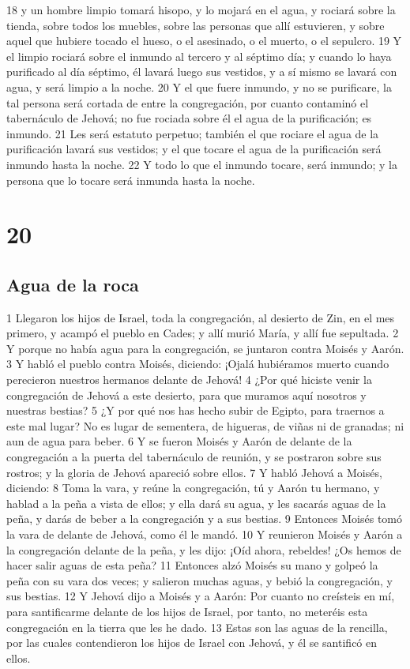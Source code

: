 18 y un hombre limpio tomará hisopo, y lo mojará en el agua, y rociará sobre la tienda, sobre todos los muebles, sobre las personas que allí estuvieren, y sobre aquel que hubiere tocado el hueso, o el asesinado, o el muerto, o el sepulcro.
19 Y el limpio rociará sobre el inmundo al tercero y al séptimo día; y cuando lo haya purificado al día séptimo, él lavará luego sus vestidos, y a sí mismo se lavará con agua, y será limpio a la noche.
20 Y el que fuere inmundo, y no se purificare, la tal persona será cortada de entre la congregación, por cuanto contaminó el tabernáculo de Jehová; no fue rociada sobre él el agua de la purificación; es inmundo.
21 Les será estatuto perpetuo; también el que rociare el agua de la purificación lavará sus vestidos; y el que tocare el agua de la purificación será inmundo hasta la noche.
22 Y todo lo que el inmundo tocare, será inmundo; y la persona que lo tocare será inmunda hasta la noche.

\chapter{20}

\section*{Agua de la roca}


1 Llegaron los hijos de Israel, toda la congregación, al desierto de Zin, en el mes primero, y acampó el pueblo en Cades; y allí murió María, y allí fue sepultada.
2 Y porque no había agua para la congregación, se juntaron contra Moisés y Aarón.
3 Y habló el pueblo contra Moisés, diciendo: ¡Ojalá hubiéramos muerto cuando perecieron nuestros hermanos delante de Jehová!
4 ¿Por qué hiciste venir la congregación de Jehová a este desierto, para que muramos aquí nosotros y nuestras bestias?
5 ¿Y por qué nos has hecho subir de Egipto, para traernos a este mal lugar? No es lugar de sementera, de higueras, de viñas ni de granadas; ni aun de agua para beber.
6 Y se fueron Moisés y Aarón de delante de la congregación a la puerta del tabernáculo de reunión, y se postraron sobre sus rostros; y la gloria de Jehová apareció sobre ellos.
7 Y habló Jehová a Moisés, diciendo:
8 Toma la vara, y reúne la congregación, tú y Aarón tu hermano, y hablad a la peña a vista de ellos; y ella dará su agua, y les sacarás aguas de la peña, y darás de beber a la congregación y a sus bestias.
9 Entonces Moisés tomó la vara de delante de Jehová, como él le mandó.
10 Y reunieron Moisés y Aarón a la congregación delante de la peña, y les dijo: ¡Oíd ahora, rebeldes! ¿Os hemos de hacer salir aguas de esta peña?
11 Entonces alzó Moisés su mano y golpeó la peña con su vara dos veces; y salieron muchas aguas, y bebió la congregación, y sus bestias.
12 Y Jehová dijo a Moisés y a Aarón: Por cuanto no creísteis en mí, para santificarme delante de los hijos de Israel, por tanto, no meteréis esta congregación en la tierra que les he dado.
13 Estas son las aguas de la rencilla, por las cuales contendieron los hijos de Israel con Jehová, y él se santificó en ellos.
